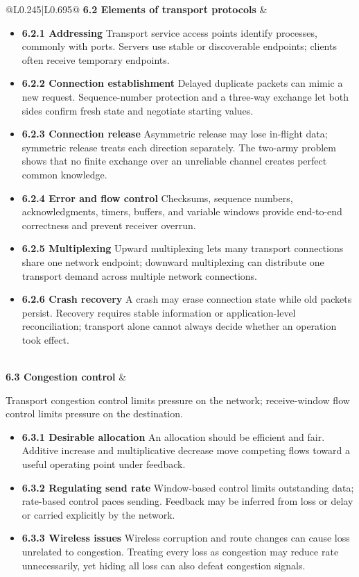 \documentclass[10pt,letterpaper]{article}
\begin{document}
\begin{longtable}{@{}L{0.245\textwidth}|L{0.695\textwidth}@{}}
\textbf{6.2 Elements of transport protocols} & \begin{minipage}[t]{\linewidth}\raggedright \begin{itemize}\item \textbf{6.2.1 Addressing} Transport service access points identify processes, commonly with ports. Servers use stable or discoverable endpoints; clients often receive temporary endpoints.\item \textbf{6.2.2 Connection establishment} Delayed duplicate packets can mimic a new request. Sequence-number protection and a three-way exchange let both sides confirm fresh state and negotiate starting values.\item \textbf{6.2.3 Connection release} Asymmetric release may lose in-flight data; symmetric release treats each direction separately. The two-army problem shows that no finite exchange over an unreliable channel creates perfect common knowledge.\item \textbf{6.2.4 Error and flow control} Checksums, sequence numbers, acknowledgments, timers, buffers, and variable windows provide end-to-end correctness and prevent receiver overrun.\item \textbf{6.2.5 Multiplexing} Upward multiplexing lets many transport connections share one network endpoint; downward multiplexing can distribute one transport demand across multiple network connections.\item \textbf{6.2.6 Crash recovery} A crash may erase connection state while old packets persist. Recovery requires stable information or application-level reconciliation; transport alone cannot always decide whether an operation took effect.\end{itemize}\end{minipage} \\ \hline
{}\textbf{6.3 Congestion control} & \begin{minipage}[t]{\linewidth}\raggedright Transport congestion control limits pressure on the network; receive-window flow control limits pressure on the destination.\par\begin{itemize}\item \textbf{6.3.1 Desirable allocation} An allocation should be efficient and fair. Additive increase and multiplicative decrease move competing flows toward a useful operating point under feedback.\item \textbf{6.3.2 Regulating send rate} Window-based control limits outstanding data; rate-based control paces sending. Feedback may be inferred from loss or delay or carried explicitly by the network.\item \textbf{6.3.3 Wireless issues} Wireless corruption and route changes can cause loss unrelated to congestion. Treating every loss as congestion may reduce rate unnecessarily, yet hiding all loss can also defeat congestion signals.\end{itemize}\end{minipage} \\ \hline

\end{longtable}
\end{document}
